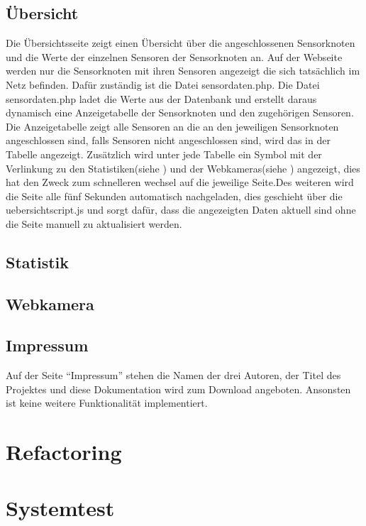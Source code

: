 \subsection{Übersicht}
Die Übersichtsseite zeigt einen Übersicht über die angeschlossenen Sensorknoten und die Werte der einzelnen Sensoren der Sensorknoten an. Auf der Webseite werden nur die Sensorknoten mit ihren Sensoren angezeigt die sich tatsächlich im Netz befinden. Dafür zuständig ist die Datei sensordaten.php. Die Datei sensordaten.php ladet die Werte aus der Datenbank und erstellt daraus dynamisch eine Anzeigetabelle der Sensorknoten und den zugehörigen Sensoren. Die Anzeigetabelle zeigt alle Sensoren an die an den jeweiligen Sensorknoten angeschlossen sind, falls Sensoren nicht angeschlossen sind, wird das in der Tabelle angezeigt. Zusätzlich wird unter jede Tabelle ein Symbol mit der Verlinkung zu den Statistiken(siehe ) und der Webkameras(siehe ) angezeigt, dies hat den Zweck zum schnelleren wechsel auf die jeweilige Seite.Des weiteren wird die Seite alle fünf Sekunden automatisch nachgeladen, dies geschieht über die uebersichtscript.js und sorgt dafür, dass die angezeigten Daten aktuell sind ohne die Seite manuell zu aktualisiert werden.

\subsection{Statistik}\label{Statistik}
\subsection{Webkamera}\label{Webkamera}
\subsection{Impressum}

Auf der Seite "`Impressum"' stehen die Namen der drei Autoren, der Titel des Projektes und diese Dokumentation wird zum Download angeboten. Ansonsten ist keine weitere Funktionalität implementiert.
\section{Refactoring}
\section{Systemtest}
